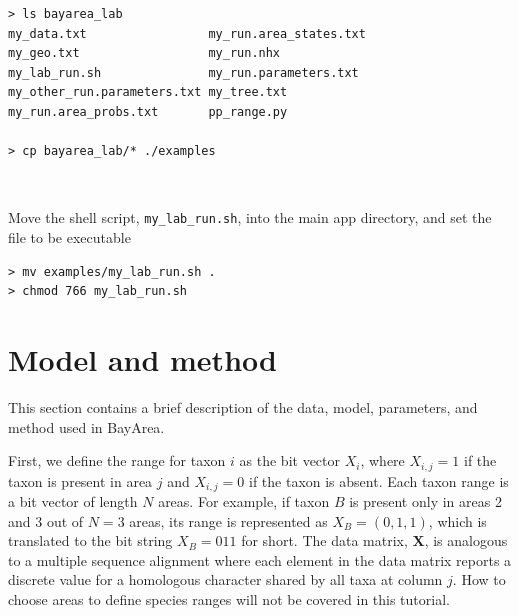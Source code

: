 \documentclass[11pt]{article}
\newcommand{\impmark}{\strut\vadjust{\domark}}
\newcommand{\domark}{%
  \vbox to 0pt{
    \kern-\dp\strutbox
    \smash{\llap{$\rightarrow$\kern1em}}
    \vss
  }%
}
\begin{document}
\begin{framed}
\begin{lstlisting}
> ls bayarea_lab
my_data.txt                 my_run.area_states.txt
my_geo.txt                  my_run.nhx
my_lab_run.sh               my_run.parameters.txt
my_other_run.parameters.txt my_tree.txt
my_run.area_probs.txt       pp_range.py

> cp bayarea_lab/* ./examples
\end{lstlisting}
\end{framed}

\noindent \\ \impmark Move the shell script, \texttt{my\_lab\_run.sh}, into the main app directory, and set the file to be executable

\begin{framed}
\begin{lstlisting}
> mv examples/my_lab_run.sh .
> chmod 766 my_lab_run.sh
\end{lstlisting}
\end{framed}

\section{Model and method}

This section contains a brief description of the data, model, parameters, and method used in BayArea.

First, we define the range for taxon $i$ as the bit vector $X_i$, where $X_{i,j} = 1$ if the taxon is present in area $j$ and $X_{i,j} = 0$ if the taxon is absent.
Each taxon range is a bit vector of length $N$ areas.
For example, if taxon $B$ is present only in areas 2 and 3 out of $N=3$ areas, its range is represented as $X_B = (0,1,1)$, which is translated to the bit string $X_B=011$ for short.
The data matrix, $\textbf{X}$, is analogous to a multiple sequence alignment where each element in the data matrix reports a discrete value for a homologous character shared by all taxa at column $j$.
How to choose areas to define species ranges will not be covered in this tutorial.

\end{document}
